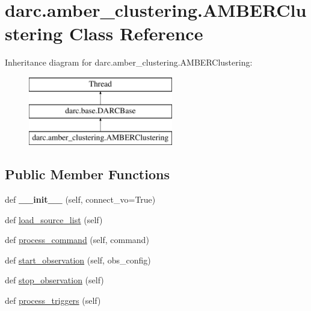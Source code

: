 \hypertarget{classdarc_1_1amber__clustering_1_1_a_m_b_e_r_clustering}{}\section{darc.\+amber\+\_\+clustering.\+A\+M\+B\+E\+R\+Clustering Class Reference}
\label{classdarc_1_1amber__clustering_1_1_a_m_b_e_r_clustering}
Inheritance diagram for darc.\+amber\+\_\+clustering.\+A\+M\+B\+E\+R\+Clustering\+:\begin{figure}[H]
\begin{center}
\leavevmode
\includegraphics[height=3.000000cm]{classdarc_1_1amber__clustering_1_1_a_m_b_e_r_clustering}
\end{center}
\end{figure}
\subsection*{Public Member Functions}
\begin{DoxyCompactItemize}
\item 
\mbox{\label{classdarc_1_1amber__clustering_1_1_a_m_b_e_r_clustering_a9138515102c72edb8ccb7b0102a07f74}} 
def {\bfseries \+\_\+\+\_\+init\+\_\+\+\_\+} (self, connect\+\_\+vo=True)
\item 
def \mbox{\hyperlink{classdarc_1_1amber__clustering_1_1_a_m_b_e_r_clustering_a11eafae05835a77e02937e8914a01d53}{load\+\_\+source\+\_\+list}} (self)
\item 
def \mbox{\hyperlink{classdarc_1_1amber__clustering_1_1_a_m_b_e_r_clustering_a4aeb420b469d629e6f3f1acb21192467}{process\+\_\+command}} (self, command)
\item 
def \mbox{\hyperlink{classdarc_1_1amber__clustering_1_1_a_m_b_e_r_clustering_a3838f63855e53bdc31190caf980a9528}{start\+\_\+observation}} (self, obs\+\_\+config)
\item 
def \mbox{\hyperlink{classdarc_1_1amber__clustering_1_1_a_m_b_e_r_clustering_a0ed3531778606456b42c13569bd86e17}{stop\+\_\+observation}} (self)
\item 
def \mbox{\hyperlink{classdarc_1_1amber__clustering_1_1_a_m_b_e_r_clustering_a6a4989b747b2c81786fdfc86964d162e}{process\+\_\+triggers}} (self)
\end{DoxyCompactItemize}
